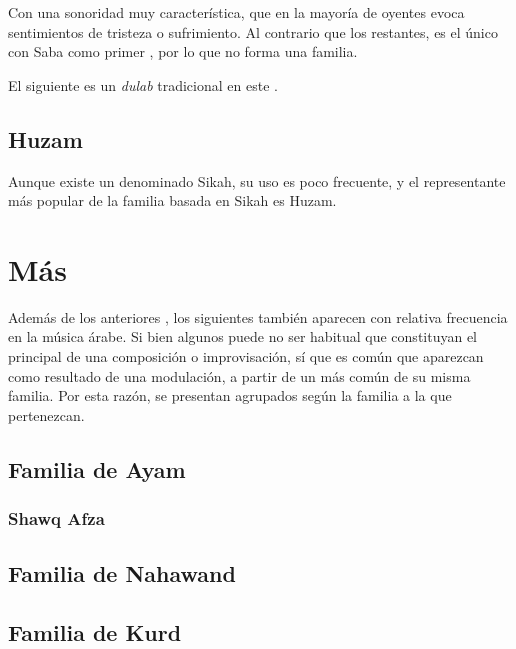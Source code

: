 Con una sonoridad muy característica, que en la mayoría de oyentes evoca sentimientos de tristeza o sufrimiento. Al contrario que los restantes, es el único \maqam con \yins Saba como primer \yins, por lo que no forma una familia.



El siguiente es un \emph{dulab} tradicional en este \maqamb.




\subsection{\Maqam Huzam}

Aunque existe un \maqam denominado Sikah, su uso es poco frecuente, y el representante más popular de la familia basada en \yins Sikah es \maqam Huzam.



\section{Más \maqamaatb}
\label{masmaqamaat}

Además de los anteriores \maqamaatb, los siguientes también aparecen con relativa frecuencia en la música árabe. Si bien algunos puede no ser habitual que constituyan el \maqam principal de una composición o improvisación, sí que es común que aparezcan como resultado de una modulación, a partir de un \maqam más común de su misma familia. Por esta razón, se presentan agrupados según la familia a la que pertenezcan.

\subsection{Familia de \yins Ayam}
\subsubsection{\Maqam Shawq Afza}


\subsection{Familia de \yins Nahawand}

\subsection{Familia de \yins Kurd}
